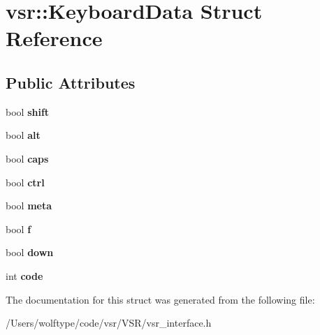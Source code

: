 \hypertarget{structvsr_1_1_keyboard_data}{\section{vsr\-:\-:Keyboard\-Data Struct Reference}
\label{structvsr_1_1_keyboard_data}
}
\subsection*{Public Attributes}
\begin{DoxyCompactItemize}
\item 
\hypertarget{structvsr_1_1_keyboard_data_a07399e33cda12b7f97587e0dec1116e4}{bool {\bfseries shift}}\label{structvsr_1_1_keyboard_data_a07399e33cda12b7f97587e0dec1116e4}

\item 
\hypertarget{structvsr_1_1_keyboard_data_a057298df8310267ab249e1a433d3cc30}{bool {\bfseries alt}}\label{structvsr_1_1_keyboard_data_a057298df8310267ab249e1a433d3cc30}

\item 
\hypertarget{structvsr_1_1_keyboard_data_a6b6395e7b9a6a5741627da05d8af530c}{bool {\bfseries caps}}\label{structvsr_1_1_keyboard_data_a6b6395e7b9a6a5741627da05d8af530c}

\item 
\hypertarget{structvsr_1_1_keyboard_data_ac834f0ac688af8f5b5d83e1878a1fa49}{bool {\bfseries ctrl}}\label{structvsr_1_1_keyboard_data_ac834f0ac688af8f5b5d83e1878a1fa49}

\item 
\hypertarget{structvsr_1_1_keyboard_data_aae468bb6acca26a396b4272478062ee4}{bool {\bfseries meta}}\label{structvsr_1_1_keyboard_data_aae468bb6acca26a396b4272478062ee4}

\item 
\hypertarget{structvsr_1_1_keyboard_data_a7b6eef09b6d924389c853b4c29ef19eb}{bool {\bfseries f}}\label{structvsr_1_1_keyboard_data_a7b6eef09b6d924389c853b4c29ef19eb}

\item 
\hypertarget{structvsr_1_1_keyboard_data_aa01256859e5245641955beb445cef549}{bool {\bfseries down}}\label{structvsr_1_1_keyboard_data_aa01256859e5245641955beb445cef549}

\item 
\hypertarget{structvsr_1_1_keyboard_data_a64584b6838980c5c1f557556d73710b4}{int {\bfseries code}}\label{structvsr_1_1_keyboard_data_a64584b6838980c5c1f557556d73710b4}

\end{DoxyCompactItemize}


The documentation for this struct was generated from the following file\-:\begin{DoxyCompactItemize}
\item 
/\-Users/wolftype/code/vsr/\-V\-S\-R/vsr\-\_\-interface.\-h\end{DoxyCompactItemize}
